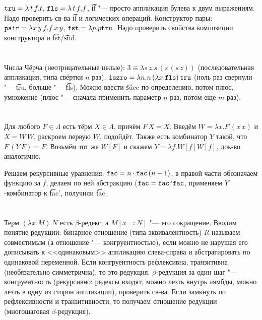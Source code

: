 \section{} %
$\texttt{tru} = \lambda\,t\,f.t$, $\texttt{fls} = \lambda\,t\,f.f$,
\t{if} "--- просто аппликация булева к двум выражениям.
Надо проверить св-ва \t{if} и логических операций.
Конструктор пары: $\texttt{pair} = \lambda x\,y\,f.f\,x\,y$, $\texttt{fst}=\lambda p.p \texttt{tru}$.
Надо проверить свойства композиции конструктора и \t{fst}/\t{snd}.

\section{} %
Числа Чёрча (неотрицательные целые): $3\equiv \lambda s\,z.s\,(s\,(s\,z))$ (последовательная аппликация,
типа свёртки $n$ раз).
$\texttt{iszro}=\lambda n . n\,(\lambda x.\texttt{fls})\,\texttt{tru}$ (ноль раз свернули "--- \t{tru}, больше "--- \t{fls}).
Можно ввести \t{succ} по определению, потом плюс, умножение (плюс "--- сначала применить параметр $n$
раз, потом еще $m$ раз).

\section{} %
Для любого $F \in \Lambda$ есть тёрм $X \in \Lambda$, причём $F\, X = X$.
Введём $W=\lambda x . F\,(x\,x)$ и $X=W\,W$, раскроем первую $W$, подойдёт.
Также есть комбинатор $Y$ такой, что $F\,(Y\,F)=F$.
Возьмём тот же $W[F]$ и скажем $Y = \lambda f . W[f] W[f]$, док-во аналогично.

Решаем рекурсивные уравнения: $\texttt{fac} = n \cdot \texttt{fac}\,(n-1)$,
в правой части обозначаем функцию за $f$, делаем по ней абстракцию ($\texttt{fac} = \texttt{fac'} \texttt{fac}$,
применяем $Y$-комбинатор к \t{fac'}, получили \t{fac}.

\section{} %
Терм $(\lambda x . M)\, N$ есть $\beta$-редекс,	а $M[x \eqcolon N]$ "--- его сокращение.
Вводим понятие редукции: бинарное отношение (типа эквивалентность) $R$ называем совместимым
(а отношение "--- конгруентностью), если
можно не нарушая его дописывать к <<одинаковым>> аппликацию слева-справа и абстрагировать по одинаковой переменной.
Если конгруентность рефлексивна, транзитивна (необязательно симметрична), то это редукция.
$\beta$-редукция за один шаг "--- конгруентность (рекурсивно: редексы входят, можно лезть внутрь лямбды,
можно лезть в одну из сторон аппликации), проверить св-ва.
Если замкнуть по рефлексивности и транзитивности, то получаем отношение редукции (многошаговая $\beta$-редукция),

